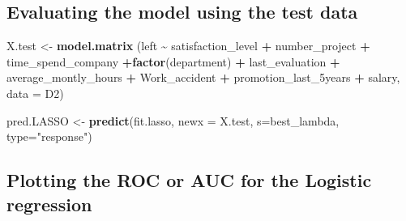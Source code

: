 \documentclass[
  11pt,
]{article}
\newenvironment{Shaded}{\begin{snugshade}}{\end{snugshade}}
\newcommand{\AttributeTok}[1]{\textcolor[rgb]{0.13,0.29,0.53}{#1}}
\newcommand{\DecValTok}[1]{\textcolor[rgb]{0.00,0.00,0.81}{#1}}
\newcommand{\FloatTok}[1]{\textcolor[rgb]{0.00,0.00,0.81}{#1}}
\newcommand{\FunctionTok}[1]{\textcolor[rgb]{0.13,0.29,0.53}{\textbf{#1}}}
\newcommand{\NormalTok}[1]{#1}
\newcommand{\OtherTok}[1]{\textcolor[rgb]{0.56,0.35,0.01}{#1}}
\newcommand{\SpecialCharTok}[1]{\textcolor[rgb]{0.81,0.36,0.00}{\textbf{#1}}}
\newcommand{\StringTok}[1]{\textcolor[rgb]{0.31,0.60,0.02}{#1}}
\begin{document}
\hfill\break

\subsection{Evaluating the model using the test data}

\begin{Shaded}
\begin{Highlighting}[]
\NormalTok{X.test }\OtherTok{\textless{}{-}} \FunctionTok{model.matrix}\NormalTok{ (left }\SpecialCharTok{\textasciitilde{}}\NormalTok{ satisfaction\_level }\SpecialCharTok{+}\NormalTok{ number\_project }\SpecialCharTok{+} 
\NormalTok{                  time\_spend\_company }\SpecialCharTok{+}\FunctionTok{factor}\NormalTok{(department) }\SpecialCharTok{+}\NormalTok{ last\_evaluation }\SpecialCharTok{+}  
\NormalTok{                  average\_montly\_hours }\SpecialCharTok{+}\NormalTok{ Work\_accident }\SpecialCharTok{+}\NormalTok{ promotion\_last\_5years }\SpecialCharTok{+} 
\NormalTok{                  salary, }\AttributeTok{data =}\NormalTok{ D2)}

\NormalTok{pred.LASSO }\OtherTok{\textless{}{-}} \FunctionTok{predict}\NormalTok{(fit.lasso, }\AttributeTok{newx =}\NormalTok{ X.test, }\AttributeTok{s=}\NormalTok{best\_lambda, }\AttributeTok{type=}\StringTok{"response"}\NormalTok{)}
\end{Highlighting}
\end{Shaded}

\hfill\break

\subsection{Plotting the ROC or AUC for the Logistic regression}

\begin{Shaded}
\end{Shaded}
\end{document}
